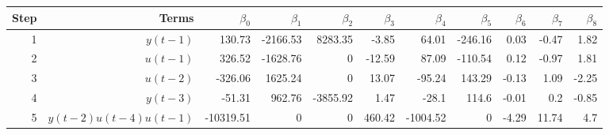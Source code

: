 \begin{tabular}{rrrrrrrrrrr}
Step & Terms & $\beta_{0}$ & $\beta_{1}$ & $\beta_{2}$ & $\beta_{3}$ & $\beta_{4}$ & $\beta_{5}$ & $\beta_{6}$ & $\beta_{7}$ & $\beta_{8}$ \\ 
\hline 
1 & $y(t-1)$ & 130.73 & -2166.53 & 8283.35 & -3.85 & 64.01 & -246.16 & 0.03 & -0.47 & 1.82 \\ 
2 & $u(t-1)$ & 326.52 & -1628.76 & 0 & -12.59 & 87.09 & -110.54 & 0.12 & -0.97 & 1.81 \\ 
3 & $u(t-2)$ & -326.06 & 1625.24 & 0 & 13.07 & -95.24 & 143.29 & -0.13 & 1.09 & -2.25 \\ 
4 & $y(t-3)$ & -51.31 & 962.76 & -3855.92 & 1.47 & -28.1 & 114.6 & -0.01 & 0.2 & -0.85 \\ 
5 & $y(t-2)u(t-4)u(t-1)$ & -10319.51 & 0 & 0 & 460.42 & -1004.52 & 0 & -4.29 & 11.74 & 4.7 \\ 
\hline 
\end{tabular}
